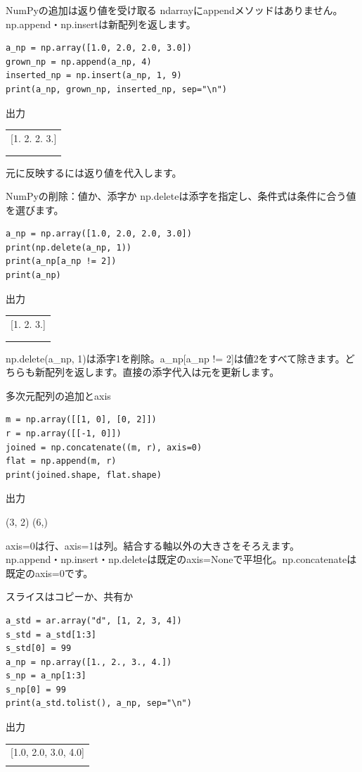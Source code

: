 \documentclass[12pt,aspectratio=43]{beamer}
\newcommand{\code}[1]{{\codefont #1}}
\newcommand{\out}[1]{%
  \par\vspace{.5mm}\noindent
  {\small\textcolor{black!60}{出力}}\hspace{1mm}%
  \begin{minipage}[t]{.88\linewidth}\vspace{0pt}%
    {\codefont\fontsize{11}{12.5}\selectfont #1}%
  \end{minipage}\par}
\begin{document}
\begin{frame}[t,fragile]{NumPyの追加は返り値を受け取る}
  \small \code{ndarray}に\code{append}メソッドはありません。\code{np.append}・\code{np.insert}は新配列を返します。
\begin{lstlisting}
a_np = np.array([1.0, 2.0, 2.0, 3.0])
grown_np = np.append(a_np, 4)
inserted_np = np.insert(a_np, 1, 9)
print(a_np, grown_np, inserted_np, sep="\n")
\end{lstlisting}
  \out{\begin{tabular}{@{}l@{}}
    [1. 2. 2. 3.]\\\relax
    [1. 2. 2. 3. 4.]\\\relax
    [1. 9. 2. 2. 3.]
  \end{tabular}}
  \small 元に反映するには返り値を代入します。
\end{frame}

\begin{frame}[t,fragile]{NumPyの削除：値か、添字か}
  \small \code{np.delete}は添字を指定し、条件式は条件に合う値を選びます。
\begin{lstlisting}
a_np = np.array([1.0, 2.0, 2.0, 3.0])
print(np.delete(a_np, 1))
print(a_np[a_np != 2])
print(a_np)
\end{lstlisting}
  \out{\begin{tabular}{@{}l@{}}
    [1. 2. 3.]\\\relax
    [1. 3.]\\\relax
    [1. 2. 2. 3.]
  \end{tabular}}
  \small \code{np.delete(a\_np, 1)}は添字1を削除。\code{a\_np[a\_np != 2]}は値2をすべて除きます。どちらも新配列を返します。直接の添字代入は元を更新します。
\end{frame}

\begin{frame}[t,fragile]{多次元配列の追加と\code{axis}}
\begin{lstlisting}
m = np.array([[1, 0], [0, 2]])
r = np.array([[-1, 0]])
joined = np.concatenate((m, r), axis=0)
flat = np.append(m, r)
print(joined.shape, flat.shape)
\end{lstlisting}
  \out{(3, 2) (6,)}
  \small \code{axis=0}は行、\code{axis=1}は列。結合する軸以外の大きさをそろえます。\\
  \code{np.append}・\code{np.insert}・\code{np.delete}は既定の\code{axis=None}で平坦化。\code{np.concatenate}は既定の\code{axis=0}です。
\end{frame}

\begin{frame}[t,fragile]{スライスはコピーか、共有か}
\begin{lstlisting}
a_std = ar.array("d", [1, 2, 3, 4])
s_std = a_std[1:3]
s_std[0] = 99
a_np = np.array([1., 2., 3., 4.])
s_np = a_np[1:3]
s_np[0] = 99
print(a_std.tolist(), a_np, sep="\n")
\end{lstlisting}
  \out{\begin{tabular}{@{}l@{}}
    [1.0, 2.0, 3.0, 4.0]\\\relax
    [ 1. 99.  3.  4.]
  \end{tabular}}
\end{frame}
\end{document}

